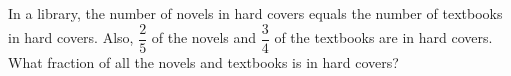 In a library, the number of novels in hard covers equals the number of textbooks in hard covers. Also, $\dfrac25$ of the novels and $\dfrac34$ of the textbooks are in hard covers. What fraction of all the novels and textbooks is in hard covers?
